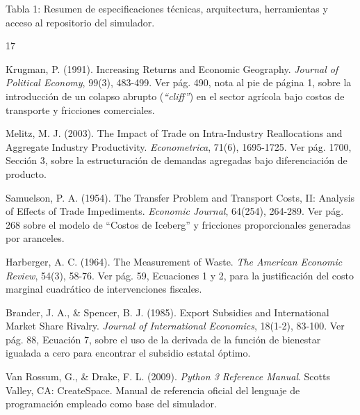 \documentclass[12pt, a4paper]{article}
\begin{document}
\vspace{0.2cm}
\begin{center}
    \small Tabla 1: Resumen de especificaciones técnicas, arquitectura, herramientas y acceso al repositorio del simulador.
\end{center}
\vspace{0.3cm}

\newpage
{}
\begin{thebibliography}{17}

Krugman, P. (1991). Increasing Returns and Economic Geography. \textit{Journal of Political Economy}, 99(3), 483-499. Ver pág. 490, nota al pie de página 1, sobre la introducción de un colapso abrupto (\textit{``cliff''}) en el sector agrícola bajo costos de transporte y fricciones comerciales.

Melitz, M. J. (2003). The Impact of Trade on Intra-Industry Reallocations and Aggregate Industry Productivity. \textit{Econometrica}, 71(6), 1695-1725. Ver pág. 1700, Sección 3, sobre la estructuración de demandas agregadas bajo diferenciación de producto.

Samuelson, P. A. (1954). The Transfer Problem and Transport Costs, II: Analysis of Effects of Trade Impediments. \textit{Economic Journal}, 64(254), 264-289. Ver pág. 268 sobre el modelo de ``Costos de Iceberg'' y fricciones proporcionales generadas por aranceles.

Harberger, A. C. (1964). The Measurement of Waste. \textit{The American Economic Review}, 54(3), 58-76. Ver pág. 59, Ecuaciones 1 y 2, para la justificación del costo marginal cuadrático de intervenciones fiscales.

Brander, J. A., \& Spencer, B. J. (1985). Export Subsidies and International Market Share Rivalry. \textit{Journal of International Economics}, 18(1-2), 83-100. Ver pág. 88, Ecuación 7, sobre el uso de la derivada de la función de bienestar igualada a cero para encontrar el subsidio estatal óptimo.

Van Rossum, G., \& Drake, F. L. (2009). \textit{Python 3 Reference Manual}. Scotts Valley, CA: CreateSpace. Manual de referencia oficial del lenguaje de programación empleado como base del simulador.


\end{thebibliography}
\end{document}

